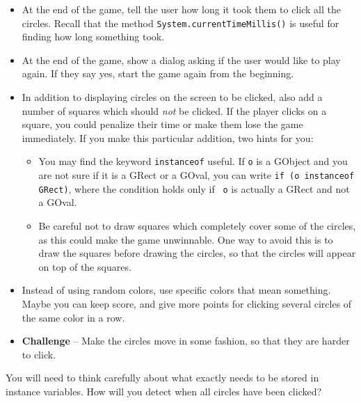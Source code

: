 \documentclass[11pt]{article}
\theoremstyle{plain}
\theoremstyle{definition}
\theoremstyle{remark}
\begin{document}
\begin{itemize}
  \item At the end of the game, tell the user how long it took them to click all
    the circles. Recall that the method \texttt{System.currentTimeMillis()} is
    useful for finding how long something took.
  \item At the end of the game, show a dialog asking if the user would like to
    play again. If they say yes, start the game again from the beginning.
  \item In addition to displaying circles on the screen to be clicked, also add
    a number of squares which should \emph{not} be clicked. If the player clicks
    on a square, you could penalize their time or make them lose the game
    immediately. If you make this particular addition, two hints for you:
    \begin{itemize}
      \item You may find the keyword {\tt instanceof} useful. If {\tt o} is a
        GObject and you are not sure if it is a GRect or a GOval, you can write
        \verb|if (o instanceof GRect)|, where the condition holds only if {\tt
        o} is actually a GRect and not a GOval.
      \item Be careful not to draw squares which completely cover some of the
        circles, as this could make the game unwinnable. One way to avoid this
        is to draw the squares before drawing the circles, so that the circles
        will appear on top of the squares.
    \end{itemize}
  \item Instead of using random colors, use specific colors that mean something.
    Maybe you can keep score, and give more points for clicking several circles
    of the same color in a row.
  \item \textbf{Challenge} -- Make the circles move in some fashion, so that
    they are harder to click.
\end{itemize}
You will need to think carefully about what exactly needs to be stored in
instance variables. How will you detect when all circles have been clicked?
\end{document}
